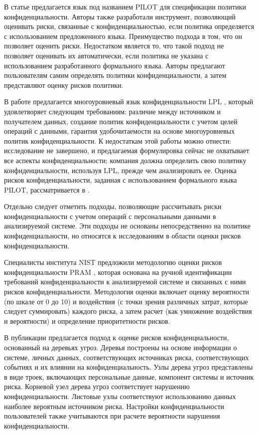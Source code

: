 \documentclass[../main]{subfiles}
\begin{document}
В статье \cite{MDPI14} предлагается язык под названием PILOT для спецификации политики конфиденциальности. Авторы также разработали инструмент, позволяющий оценивать риски, связанные с конфиденциальностью, если политика определяется с использованием предложенного языка. Преимущество подхода в том, что он позволяет оценить риски. Недостатком является то, что такой подход не позволяет оценивать их автоматически, если политика не указана с использованием разработанного формального языка. Авторы предлагают пользователям самим определять политики конфиденциальности, а затем представляют оценку рисков политики.

В работе \cite{MDPI15} предлагается многоуровневый язык конфиденциальности LPL \cite{MDPI15}, который удовлетворяет следующим требованиям: различие между источником и получателем данных, создание политик конфиденциальности с учетом целей операций с данными, гарантия удобочитаемости на основе многоуровневых политик конфиденциальности. К недостаткам этой работы можно отнести: исследование не завершено, и предлагаемая формулировка сейчас не охватывает все аспекты конфиденциальности; компания должна определить свою политику конфиденциальности, используя LPL, прежде чем анализировать ее. Оценка рисков конфиденциальности, заданная с использованием формального языка PILOT, рассматривается в \cite{MDPI14}.

Отдельно следует отметить подходы, позволяющие рассчитывать риски конфиденциальности с учетом операций с персональными данными в анализируемой системе. Эти подходы не основаны непосредственно на политике конфиденциальности, но относятся к исследованиям в области оценки рисков конфиденциальности.

Специалисты института NIST предложили методологию оценки рисков конфиденциальности PRAM \cite{MDPI16}, которая основана на ручной идентификации требований конфиденциальности к анализируемой системе и связанных с ними рисков конфиденциальности. Методология оценки включает оценку вероятности (по шкале от 0 до 10) и воздействия (с точки зрения различных затрат, которые следует суммировать) каждого риска, а затем расчет (как умножение воздействия и вероятности) и определение приоритетности рисков.

В публикации \cite{MDPI17} предлагается подход к оценке рисков конфиденциальности, основанный на деревьях угроз. Деревья построены на основе информации о системе, личных данных, соответствующих источниках риска, соответствующих событиях и их влиянии на конфиденциальность. Узлы дерева угроз представлены в виде троек, включающих персональные данные, компонент системы и источник риска. Корневой узел дерева угроз соответствует нарушению конфиденциальности. Листовые узлы соответствуют использованию данных наиболее вероятным источником риска. Настройки конфиденциальности пользователей также учитываются при расчете вероятности нарушения конфиденциальности.
\end{document}
